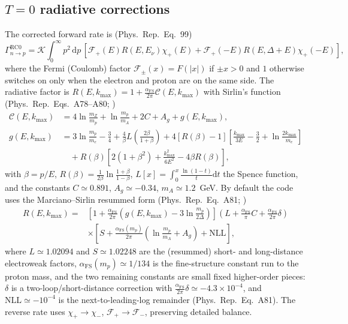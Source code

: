 \documentclass[11pt,a4paper]{article}
\newcommand{\dd}{\mathrm{d}}
\newcommand{\PR}{Phys.\ Rep.}
\newcommand{\Gap}{\Delta}
\newcommand{\Kw}{\mathcal{K}}
\newcommand{\afs}{\alpha_{\mathrm{FS}}}
\begin{document}
\subsection*{$T=0$ radiative corrections}
The corrected forward rate is (\PR\ Eq.~99)
\begin{equation}
  \Gamma^{\mathrm{RC}0}_{n\to p}=\Kw\!\int_0^\infty\! p^2\,\dd p\,
    \left[\mathcal F_+(E)R(E,E_\nu)\chi_+(E)
        +\mathcal F_+(-E)R(E,\Gap+E)\chi_+(-E)\right],
\end{equation}
where the Fermi (Coulomb) factor $\mathcal F_\pm(x)=F(|x|)$ if $\pm x>0$ and $1$
otherwise switches on only when the electron and proton are on the same side.
The radiative factor is $R(E,k_{\max})=1+\frac{\afs}{2\pi}\mathcal C(E,k_{\max})$
with Sirlin's function (\PR\ Eqs.~A78--A80; \cite{Sirlin1967})
\begin{align}
  \mathcal C(E,k_{\max}) &= 4\ln\frac{m_Z}{m_p}+\ln\frac{m_p}{m_A}+2C+A_g
     + g(E,k_{\max}),\\
  g(E,k_{\max}) &= 3\ln\frac{m_p}{m_e}-\frac34
     + \frac{4}{\beta}L\!\left(\frac{2\beta}{1+\beta}\right)
     + 4[R(\beta)-1]\!\left[\frac{k_{\max}}{3E}-\frac32+\ln\frac{2k_{\max}}{m_e}\right]
     \nonumber\\
     &\quad + R(\beta)\left[2(1+\beta^2)+\frac{k_{\max}^2}{6E^2}-4\beta R(\beta)\right],
\end{align}
with $\beta=p/E$, $R(\beta)=\tfrac{1}{2\beta}\ln\tfrac{1+\beta}{1-\beta}$,
$L[x]=\int_0^x\tfrac{\ln(1-t)}{t}\dd t$ the Spence function, and the constants
$C\simeq0.891$, $A_g\simeq-0.34$, $m_A\simeq1.2$~GeV. By default the code uses
the Marciano--Sirlin resummed form (\PR\ Eq.~A81; \cite{Czarnecki2004})
\begin{equation}
\begin{aligned}
  R(E,k_{\max}) = {}&\left[1+\tfrac{\afs}{2\pi}\left(g(E,k_{\max})-3\ln\tfrac{m_p}{2\Gap}\right)\right]
    \left(L+\tfrac{\afs}{\pi}C+\tfrac{\afs}{2\pi}\delta\right)\\
    &\times\left[S+\tfrac{\afs(m_p)}{2\pi}\left(\ln\tfrac{m_p}{m_A}+A_g\right)+\text{NLL}\right],
\end{aligned}
\end{equation}
where $L\simeq1.02094$ and $S\simeq1.02248$ are the (resummed) short- and
long-distance electroweak factors, $\afs(m_p)\simeq1/134$ is the fine-structure
constant run to the proton mass, and the two remaining constants are small
fixed higher-order pieces: $\delta$ is a two-loop/short-distance correction with
$\tfrac{\afs}{2\pi}\delta\simeq-4.3\times10^{-4}$, and $\mathrm{NLL}\simeq-10^{-4}$
is the next-to-leading-log remainder (\PR\ Eq.~A81). The reverse rate
uses $\chi_+\to\chi_-$, $\mathcal F_+\to\mathcal F_-$, preserving detailed balance.
\end{document}
